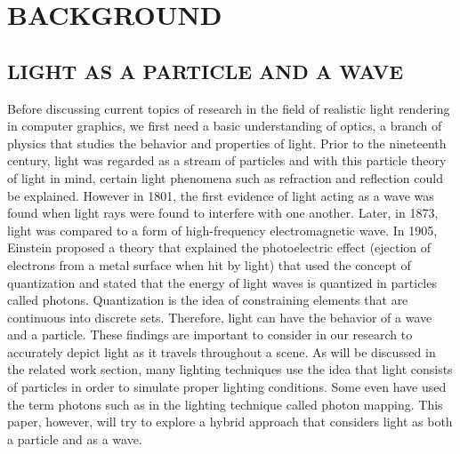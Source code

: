 \chapter{BACKGROUND}

\section{LIGHT AS A PARTICLE AND A WAVE}
Before discussing current topics of research in the field of realistic light rendering in computer graphics, we first need a basic understanding of optics, a branch of physics that studies the behavior and properties of light.  Prior to the nineteenth century, light was regarded as a stream of particles and with this particle theory of light in mind, certain light phenomena such as refraction and reflection could be explained.  However in 1801, the first evidence of light acting as a wave was found when light rays were found to interfere with one another.  Later, in 1873, light was compared to a form of high-frequency electromagnetic wave.  In 1905, Einstein proposed a theory that explained the photoelectric effect (ejection of electrons from a metal surface when hit by light) that used the concept of quantization and stated that the energy of light waves is quantized in particles called photons. Quantization is the idea of constraining elements that are continuous into discrete sets. \cite{Serway2004}  Therefore, light can have the behavior of a wave and a particle.  These findings are important to consider in our research to accurately depict light as it travels throughout a scene.  As will be discussed in the related work section, many lighting techniques use the idea that light consists of particles in order to simulate proper lighting conditions.  Some even have used the term photons such as in the lighting technique called photon mapping.  This paper, however, will try to explore a hybrid approach that considers light as both a particle and as a wave.

